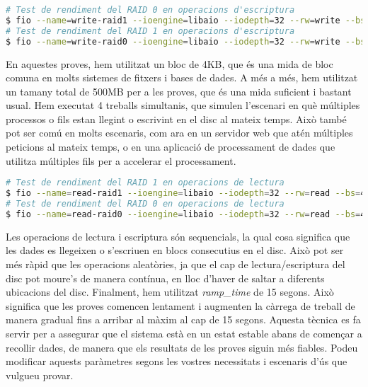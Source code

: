 \begin{lstlisting}[language=bash, numbers=none]
# Test de rendiment del RAID 0 en operacions d'escriptura  
$ fio --name=write-raid1 --ioengine=libaio --iodepth=32 --rw=write --bs=4k --size=500M --numjobs=4 --runtime=120 --time_based --ramp_time=15 --group_reporting --filename=/dev/raid1 --output-format=json --output=/tmp/write-raid1.json
# Test de rendiment del RAID 1 en operacions d'escriptura       
$ fio --name=write-raid0 --ioengine=libaio --iodepth=32 --rw=write --bs=4k --size=500M --numjobs=4 --runtime=120 --time_based --ramp_time=15 --group_reporting --filename=/dev/raid0 --output-format=json --output=/tmp/write-raid0.json  
\end{lstlisting}

En aquestes proves, hem utilitzat un bloc de 4KB, que és una mida de bloc comuna en molts sistemes de fitxers i bases de dades. A més a més, hem utilitzat un tamany total de 500MB per a les proves, que és una mida suficient i bastant usual. Hem executat 4 treballs simultanis, que simulen l'escenari en què múltiples processos o fils estan llegint o escrivint en el disc al mateix temps. Això també pot ser comú en molts escenaris, com ara en un servidor web que atén múltiples peticions al mateix temps, o en una aplicació de processament de dades que utilitza múltiples fils per a accelerar el processament. 

\begin{lstlisting}[language=bash, numbers=none]
# Test de rendiment del RAID 1 en operacions de lectura
$ fio --name=read-raid1 --ioengine=libaio --iodepth=32 --rw=read --bs=4k --size=500M --numjobs=4 --runtime=120 --time_based --ramp_time=15 --group_reporting --filename=/dev/raid1 --output-format=json --output=/tmp/read-raid1.json
# Test de rendiment del RAID 0 en operacions de lectura              
$ fio --name=read-raid0 --ioengine=libaio --iodepth=32 --rw=read --bs=4k --size=500M --numjobs=4 --runtime=120 --time_based --ramp_time=15 --group_reporting --filename=/dev/raid0 --output-format=json --output=/tmp/read-raid0.json
\end{lstlisting}

Les operacions de lectura i escriptura són sequencials, la qual cosa significa que les dades es llegeixen o s'escriuen en blocs consecutius en el disc. Això pot ser més ràpid que les operacions aleatòries, ja que el cap de lectura/escriptura del disc pot moure's de manera contínua, en lloc d'haver de saltar a diferents ubicacions del disc. Finalment, hem utilitzat \textit{ramp\_time} de 15 segons. Això significa que les proves comencen lentament i augmenten la càrrega de treball de manera gradual fins a arribar al màxim al cap de 15 segons. Aquesta tècnica es fa servir per a assegurar que el sistema està en un estat estable abans de començar a recollir dades, de manera que els resultats de les proves siguin més fiables. Podeu modificar aquests paràmetres segons les vostres necessitats i escenaris d'ús que vulgueu provar.

